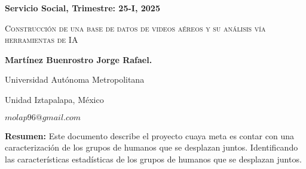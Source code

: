\documentclass[letterpaper,11pt,twoside]{report}
\date{}
\begin{document}
    \centerline{\bf Servicio Social, Trimestre: 25-I, 2025}
    \centerline{}
    \centerline{}
    \begin{center}
    \Large{\textsc{Construcci\'on de una base de datos de videos a\'ereos y su an\'alisis v\'ia herramientas
de IA
}}
    \end{center}
    \centerline{}
    \centerline{\bf {Martínez Buenrostro Jorge Rafael.}}
    \centerline{}
    \centerline{Universidad Aut\'onoma Metropolitana}
    \centerline{Unidad Iztapalapa, M\'exico}
    \centerline{$molap96@gmail.com$}
    \newtheorem{Theorem}{\quad Theorem}[section]
    \newtheorem{Definition}[Theorem]{\quad Definition}
    \newtheorem{Corollary}[Theorem]{\quad Corollary}
    \newtheorem{Lemma}[Theorem]{\quad Lemma}
    \newtheorem{Example}[Theorem]{\quad Example}
    \bigskip
    \textbf{Resumen:}  Este documento describe el proyecto cuaya meta es contar con una caracterización de los grupos de humanos que se desplazan juntos. Identificando las características estadísticas de los grupos de humanos que se desplazan juntos.

	

	

	

	
\end{document}
